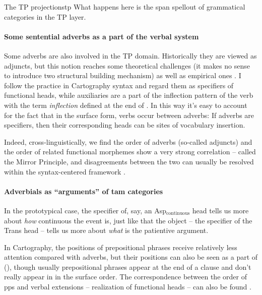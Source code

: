 \documentclass[UTF8, a4paper, oneside, scheme=plain]{ctexrep}
\newcommand*{\citepage}[1]{p.~{#1}}
\newcommand*{\term}[1]{\emph{#1}}
\begin{document}
\begin{theorybox}{The TP projections}{tp}
    What happens here is the span spellout of grammatical categories in the TP layer.
    \paragraph*{Some sentential adverbs as a part of the verbal system} 
    Some adverbs are also involved in the TP domain.
    Historically they are viewed as adjuncts,
    but this notion reaches some theoretical challenges 
    (it makes no sense to introduce two structural building mechanism)
    as well as empirical ones \citep{sportiche2017fewer}.
    I follow the practice in Cartography syntax and regard them as specifiers of functional heads,
    while auxiliaries are a part of the inflection pattern of the verb 
    with the term \term{inflection} defined 
    at the end of .
    In this way it's easy to account for the fact that 
    in the surface form, verbs occur between adverbs:
    If adverbs are specifiers,
    then their corresponding heads can be sites of vocabulary insertion.

    Indeed, cross-linguistically, 
    we find the order of adverbs (so-called adjuncts) and the order of related functional morphemes 
    show a very strong correlation -- called the Mirror Principle,
    and disagreements between the two can usually be resolved 
    within the syntax-centered framework \citep{harley2010affixation}.

    \paragraph*{Adverbials as ``arguments'' of \acs{tam} categories} In the prototypical case, 
    the specifier of, say, an Asp$_{\text{continuous}}$ head 
    tells us more about \emph{how} continuous the event is,
    just like that the object -- the specifier of the Trans head -- 
    tells us more about \emph{what} is the patientive argument.

    In Cartography, the positions of prepositional phrases receive relatively less attention compared with adverbs,
    but their positions can also be seen as a part of 
    (\citealt[\citepage{106}]{schweikert2005order}),
    though usually prepositional phrases appear at the end of a clause 
    and don't really appear in  in the surface order.
    The correspondence between the order of \acs{pp}s and verbal extensions 
    -- realization of functional heads -- 
    can also be found \citep[\citepage{160}]{cinque2006restructuring}.
    

\end{theorybox}
\end{document}
